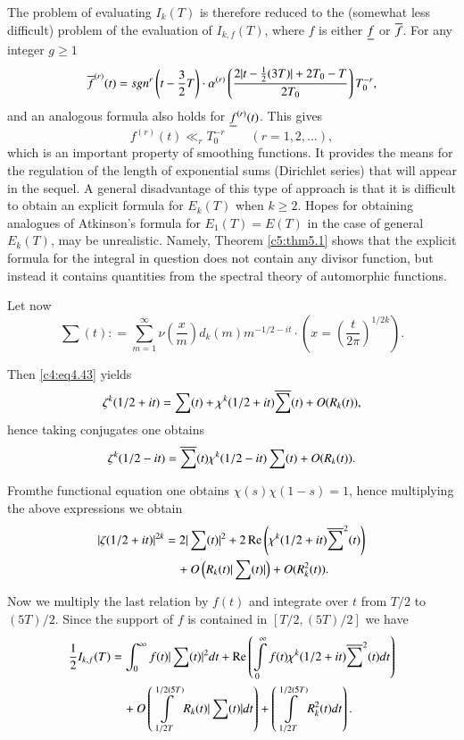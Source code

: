 The problem of evaluating $I_k(T)$ is therefore reduced to the
(somewhat less difficult) problem of the evaluation of $I_{k, f} (T)$,
where $f$ is either $\underline{f}$ or $\overline{f}$. For any integer $g \geq 1$
$$
\overline{f}^{(r)} (t) = sgn^r \left(t- \frac{3}{2} T\right)\cdot
\alpha^{(r)} \left(\frac{2 |t - \frac{1}{2} (3T)| + 2 T_0 - T}{2T_0}
\right) T_0^{-r},  
$$
and an analogous formula also holds for $\underline{f}^{(r)}(t)$. This gives
\begin{equation}
  f^{(r)} (t) \ll _r T_0^{-r} \qquad (r= 1, 2,
  \ldots),\label{c4:eq4.50} 
\end{equation}
which is an important property of smoothing functions. It provides the
means for the regulation of the length of exponential sums (Dirichlet
series) that will appear in the sequel. A general disadvantage of this
type of approach is that it is difficult to obtain an explicit formula
for $E_k(T)$ when $k \geq 2$. Hopes for obtaining analogues of
Atkinson's formula for $E_1 (T)= E(T)$ in the case of general
$E_k(T)$, may be unrealistic. Namely, Theorem \ref{c5:thm5.1} shows
that the explicit formula for the integral in question does not
contain any divisor function, but instead it contains quantities from
the spectral theory of automorphic functions. 

Let now
\begin{equation}
  \sum(t) : = \sum_{m=1}^\infty \nu \left(\frac{x}{m}\right) d_k (m) m^{-1/2-
  it}\cdot\left(x = \left(\frac{t}{2 \pi} \right)^{1/2k} \right). \label{c4:eq4.51}
\end{equation}

Then \eqref{c4:eq4.43} yields
$$
\zeta^k (1/2 + it) = \sum(t) + \chi^k (1/2 +it)\overline{\sum}(t) + O(R_k (t)),
$$
hence taking conjugates one obtains
$$
\zeta^k (1/2 -it)= \overline{\sum} (t) \chi^k (1/2-it) \sum (t) + O(R_k (t)).
$$

From\pageoriginale the functional equation one obtains $\chi(s)
\chi(1-s)=1$, hence multiplying the above expressions we obtain 
\begin{align*}
  |\zeta (1/2 + it)|^{2k} &= 2 |\sum (t)|^2 + 2 \operatorname{Re} \left(\chi^k (1/2 +
  it)  \overline{\sum}^2 (t)\right)\\
&\quad + O \left(R_k (t) | \sum (t)|\right)+ O(R^2_k (t)).
\end{align*}

Now we multiply the last relation by $f(t)$ and integrate over $t$
from $T/2$ to $(5T)/2$. Since the support of $f$ is contained in
$[T/2, (5T)/2]$ we have
{\fontsize{10}{12}\selectfont
\begin{align*}
\frac{1}{2} I_{k, f}(T) &= \int_0^\infty f(t) |\sum (t)|^2
  dt + \operatorname{Re} \left(\int\limits_0^\infty f(t) \chi^k (1/2 + it)
  \overline{\sum}^2 (t) dt\right)\\
&\quad  + O \left(\int\limits_{1/2 T}^{1/2 (5T)} R_k (t) |\sum (t)|dt
  \right) + \left(\int\limits_{1/2 T}^{1/2 (5T)} R_k^2 (t) dt \right).
\end{align*}}

